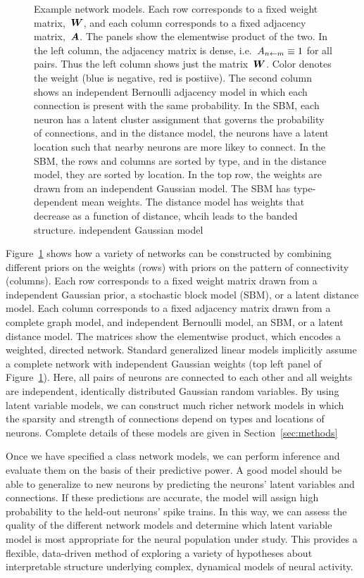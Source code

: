 \begin{figure}[t!]
\begin{subfigure}[b]{1.10in}
  \end{subfigure}
  \caption{Example network models. Each row corresponds to a fixed weight matrix,~$\boldsymbol{W}$, 
    and each column corresponds to a fixed adjacency matrix,~$\boldsymbol{A}$. The panels show 
    the elementwise product of the two. In the left column, the adjacency matrix is 
    dense, i.e.~$A_{n \leftarrow m} \equiv 1$ for all pairs. Thus the left column shows
    just the matrix~$\boldsymbol{W}$. Color denotes the weight (blue is negative, red is postiive).
    The second column shows an independent Bernoulli adjacency 
    model in which each connection is present with the same probability. In the SBM, 
    each neuron has a latent cluster assignment that governs the probability of 
    connections, and in the distance model, the neurons have a latent location such 
    that nearby neurons are more likey to connect. In the SBM, the rows and columns 
    are sorted by type, and in the distance model, they are sorted by location. 
    In the top row, the weights are drawn from an independent Gaussian model. The 
    SBM has type-dependent mean weights. The distance model has weights that 
    decrease as a function of distance, whcih leads to the banded structure.
    independent Gaussian model}
  \label{fig:network_models}
\end{figure}

Figure~\ref{fig:network_models} shows how a variety of networks can be 
constructed by combining different priors on the weights 
(rows) with priors on the pattern of 
connectivity (columns). Each row corresponds to a fixed weight matrix 
drawn from a independent Gaussian prior, a stochastic block model (SBM), or a latent 
distance model. Each column corresponds to a fixed adjacency matrix 
drawn from a complete graph model, and independent Bernoulli model, 
an SBM, or a latent distance model. The matrices show the elementwise 
product, which encodes a weighted, directed network. Standard generalized linear models implicitly assume a complete network with 
independent Gaussian weights (top left panel of Figure~\ref{fig:network_models}).
Here, all pairs of neurons are connected to each other and all weights are 
independent, identically distributed Gaussian random variables. By using latent variable 
models, we can construct much richer network models in which the sparsity 
and strength of connections depend on types and locations of neurons. 
Complete details of these models are given in Section~\ref{sec:methods}

Once we have specified a class network models, we can perform inference and 
evaluate them on the basis of their predictive power. A good model should 
be able to generalize to new neurons by predicting the neurons' latent 
variables and connections. If these predictions are accurate, the model 
will assign high probability to the held-out neurons' spike trains. 
In this way, we can assess the quality of the different network models
and determine which latent variable model is most appropriate for the 
neural population under study. This provides a flexible, data-driven 
method of exploring a variety of hypotheses about interpretable structure 
underlying complex, dynamical models of neural activity.


